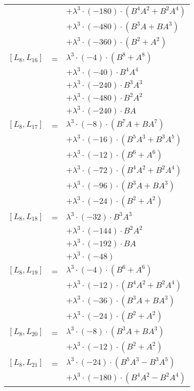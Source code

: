 \documentclass{article}
\begin{document}
\begin{center}
\begin{longtable}{lll}
 & & $ + {\lambda}^3{\cdot}(-180){\cdot}(B^{4}A^{2}+B^{2}A^{4})$ \\*
 & & $ + {\lambda}^3{\cdot}(-480){\cdot}(B^{3}A+BA^{3})$ \\*
 & & $ + {\lambda}^3{\cdot}(-360){\cdot}(B^{2}+A^{2})$ \\
$[L_{8},L_{16}]$ & = & ${\lambda}^3{\cdot}(-4){\cdot}(B^{8}+A^{8})$ \\*
 & & $ + {\lambda}^3{\cdot}(-40){\cdot}B^{4}A^{4}$ \\*
 & & $ + {\lambda}^3{\cdot}(-240){\cdot}B^{3}A^{3}$ \\*
 & & $ + {\lambda}^3{\cdot}(-480){\cdot}B^{2}A^{2}$ \\*
 & & $ + {\lambda}^3{\cdot}(-240){\cdot}BA$ \\
$[L_{8},L_{17}]$ & = & ${\lambda}^3{\cdot}(-8){\cdot}(B^{7}A+BA^{7})$ \\*
 & & $ + {\lambda}^3{\cdot}(-16){\cdot}(B^{5}A^{3}+B^{3}A^{5})$ \\*
 & & $ + {\lambda}^3{\cdot}(-12){\cdot}(B^{6}+A^{6})$ \\*
 & & $ + {\lambda}^3{\cdot}(-72){\cdot}(B^{4}A^{2}+B^{2}A^{4})$ \\*
 & & $ + {\lambda}^3{\cdot}(-96){\cdot}(B^{3}A+BA^{3})$ \\*
 & & $ + {\lambda}^3{\cdot}(-24){\cdot}(B^{2}+A^{2})$ \\
$[L_{8},L_{18}]$ & = & ${\lambda}^3{\cdot}(-32){\cdot}B^{3}A^{3}$ \\*
 & & $ + {\lambda}^3{\cdot}(-144){\cdot}B^{2}A^{2}$ \\*
 & & $ + {\lambda}^3{\cdot}(-192){\cdot}BA$ \\*
 & & $ + {\lambda}^3{\cdot}(-48)$ \\
$[L_{8},L_{19}]$ & = & ${\lambda}^3{\cdot}(-4){\cdot}(B^{6}+A^{6})$ \\*
 & & $ + {\lambda}^3{\cdot}(-12){\cdot}(B^{4}A^{2}+B^{2}A^{4})$ \\*
 & & $ + {\lambda}^3{\cdot}(-36){\cdot}(B^{3}A+BA^{3})$ \\*
 & & $ + {\lambda}^3{\cdot}(-24){\cdot}(B^{2}+A^{2})$ \\
$[L_{8},L_{20}]$ & = & ${\lambda}^3{\cdot}(-8){\cdot}(B^{3}A+BA^{3})$ \\*
 & & $ + {\lambda}^3{\cdot}(-12){\cdot}(B^{2}+A^{2})$ \\
$[L_{8},L_{21}]$ & = & ${\lambda}^3{\cdot}(-24){\cdot}(B^{5}A^{3}-B^{3}A^{5})$ \\*
 & & $ + {\lambda}^3{\cdot}(-180){\cdot}(B^{4}A^{2}-B^{2}A^{4})$ \\*

\end{longtable}
\end{center}
\end{document}
